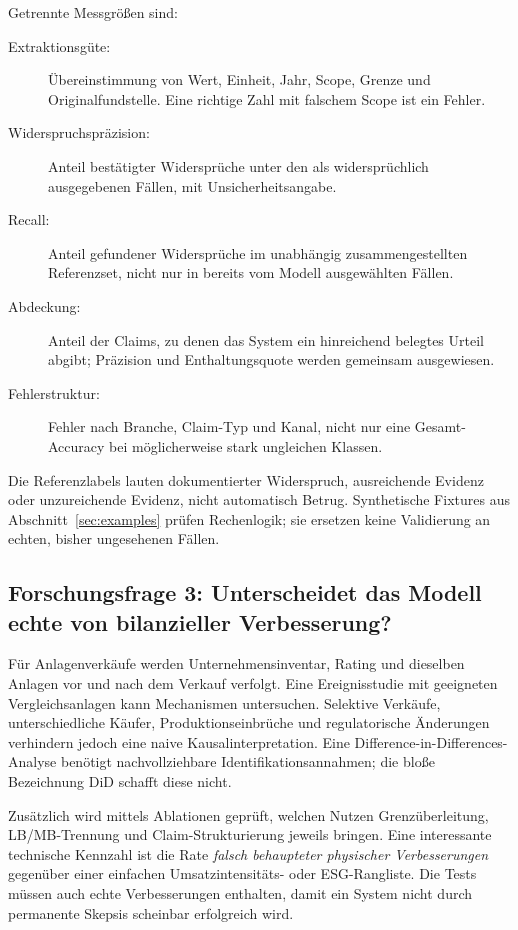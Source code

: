 \documentclass[11pt,a4paper]{article}
\begin{document}
Getrennte Messgrößen sind:
\begin{description}
\item[Extraktionsgüte:] Übereinstimmung von Wert, Einheit, Jahr, Scope, Grenze und Originalfundstelle. Eine richtige Zahl mit falschem Scope ist ein Fehler.
\item[Widerspruchspräzision:] Anteil bestätigter Widersprüche unter den als widersprüchlich ausgegebenen Fällen, mit Unsicherheitsangabe.
\item[Recall:] Anteil gefundener Widersprüche im unabhängig zusammengestellten Referenzset, nicht nur in bereits vom Modell ausgewählten Fällen.
\item[Abdeckung:] Anteil der Claims, zu denen das System ein hinreichend belegtes Urteil abgibt; Präzision und Enthaltungsquote werden gemeinsam ausgewiesen.
\item[Fehlerstruktur:] Fehler nach Branche, Claim-Typ und Kanal, nicht nur eine Gesamt-Accuracy bei möglicherweise stark ungleichen Klassen.
\end{description}
Die Referenzlabels lauten \glqq dokumentierter Widerspruch\grqq, \glqq ausreichende Evidenz\grqq{} oder \glqq unzureichende Evidenz\grqq, nicht automatisch \glqq Betrug\grqq. Synthetische Fixtures aus Abschnitt~\ref{sec:examples} prüfen Rechenlogik; sie ersetzen keine Validierung an echten, bisher ungesehenen Fällen.

\subsection{Forschungsfrage 3: Unterscheidet das Modell echte von bilanzieller Verbesserung?}
Für Anlagenverkäufe werden Unternehmensinventar, Rating und dieselben Anlagen vor und nach dem Verkauf verfolgt. Eine Ereignisstudie mit geeigneten Vergleichsanlagen kann Mechanismen untersuchen. Selektive Verkäufe, unterschiedliche Käufer, Produktionseinbrüche und regulatorische Änderungen verhindern jedoch eine naive Kausalinterpretation. Eine Difference-in-Differences-Analyse benötigt nachvollziehbare Identifikationsannahmen; die bloße Bezeichnung \glqq DiD\grqq{} schafft diese nicht.

Zusätzlich wird mittels Ablationen geprüft, welchen Nutzen Grenzüberleitung, LB/MB-Trennung und Claim-Strukturierung jeweils bringen. Eine interessante technische Kennzahl ist die Rate \emph{falsch behaupteter physischer Verbesserungen} gegenüber einer einfachen Umsatzintensitäts- oder ESG-Rangliste. Die Tests müssen auch echte Verbesserungen enthalten, damit ein System nicht durch permanente Skepsis scheinbar erfolgreich wird.
\end{document}
